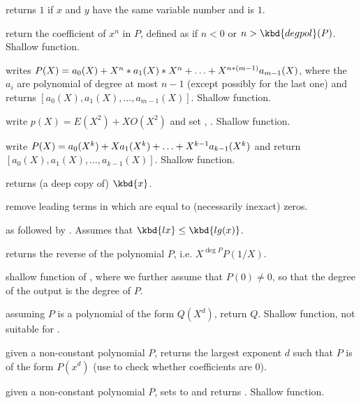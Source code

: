  returns $1$ if $x$ and $y$
have the same variable number and  is $1$.


 return the coefficient of $x^n$ in $P$,
defined as  if $n < 0$ or $n > \kbd{degpol}(P)$. Shallow
function.

 writes
$P(X)=a_0(X)+X^n*a_1(X)*X^n+\ldots+X^{n*(m-1)}\*a_{m-1}(X)$,
where the $a_i$ are polynomial of degree at most $n-1$
(except possibly for the last one) and returns
$[a_0(X),a_1(X),\ldots,a_{m-1}(X)]$.  Shallow function.

 write $p(X) = E(X^2) +
X O(X^2)$ and set , .  Shallow function.

 write
$P(X)=a_0(X^k)+X\*a_1(X^k)+\ldots+X^{k-1}\*a_{k-1}(X^k)$ and return
$[a_0(X),a_1(X),\ldots,a_{k-1}(X)]$.  Shallow function.

 returns (a deep copy of) $\kbd{x}$.

 remove leading terms in  which are
equal to (necessarily inexact) zeros.

 as 
followed by . Assumes that $\kbd{lx} \leq
\kbd{lg(x)}$.

 returns the reverse of the polynomial
$P$, i.e. $X^{\deg P} P(1/X)$.

 shallow function of ,
where we further assume that $P(0)\neq 0$, so that the degree of the output
is the degree of $P$.

 assuming $P$ is a polynomial of the
form $Q(X^d)$, return $Q$. Shallow function, not suitable for
.

 given a non-constant polynomial
$P$, returns the largest exponent $d$ such that $P$ is of the form $P(x^d)$
(use  to check whether coefficients are 0).

 given a non-constant polynomial
$P$, sets  to  and
returns . Shallow function.

